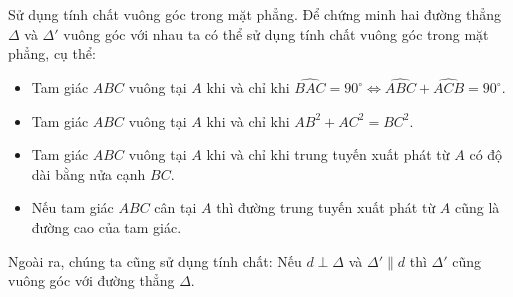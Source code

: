 \begin{dang}{Sử dụng tính chất vuông góc trong mặt phẳng.}
	Để chứng minh hai đường thẳng $\Delta$ và $\Delta'$ vuông góc với nhau ta có thể sử dụng tính chất vuông góc trong mặt phẳng, cụ thể:
	\begin{itemize}
	\item Tam giác $ABC$ vuông tại $A$ khi và chỉ khi $\widehat{BAC}=90^{\circ} \Leftrightarrow \widehat{ABC}+\widehat{ACB}=90^{\circ}.$
	\item Tam giác $ABC$ vuông tại $A$ khi và chỉ khi $AB^2+AC^2=BC^2.$
	\item Tam giác $ABC$ vuông tại $A$ khi và chỉ khi trung tuyến xuất phát từ $A$ có độ dài bằng nửa cạnh $BC$.
	\item Nếu tam giác $ABC$ cân tại $A$ thì đường trung tuyến xuất phát từ $A$ cũng là đường cao của tam giác.
	\end{itemize}
	Ngoài ra, chúng ta cũng sử dụng tính chất: Nếu $d\perp \Delta$ và $\Delta'\parallel d$ thì $\Delta'$ cũng vuông góc với đường thẳng $\Delta.$
\end{dang}
